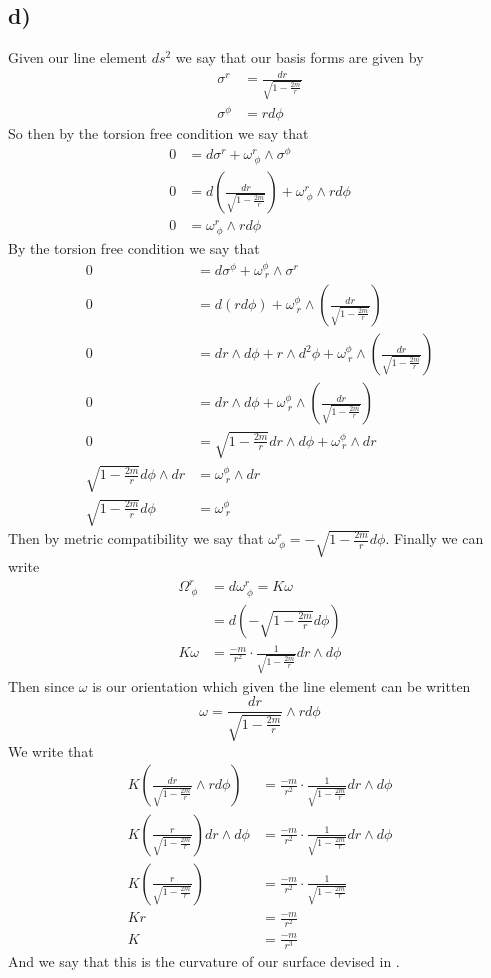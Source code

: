 \documentclass{article}
\theoremstyle{definition}
\begin{document}
\subsection*{d)}
Given our line element $ds^2$ we say that our basis forms are given by 
\begin{align*}
  \sigma^r &= \frac{dr}{\sqrt{1- \frac{2m}{r}}}\\
  \sigma^\phi &= rd\phi
\end{align*}
So then by the torsion free condition we say that
\begin{align*}
  0 &= d\sigma^r + \omega^r_{\ \phi} \wedge \sigma^\phi\\
  0 &= d\left(\frac{dr}{\sqrt{1-\frac{2m}{r}}}\right) + \omega^r_{\ \phi} \wedge rd\phi\\
  0 & = \omega^r_{\ \phi} \wedge r d\phi
\end{align*}
By the torsion free condition we say that 
\begin{align*}
  0&= d\sigma^\phi + \omega^\phi_{\ r} \wedge \sigma^r \\
  0 &= d(rd\phi) + \omega^\phi_{\ r} \wedge \left(\frac{dr}{\sqrt{1- \frac{2m}{r}}}\right)\\
  0 &= dr \wedge d\phi  + r \wedge d^2 \phi + \omega^\phi_{\ r} \wedge \left(\frac{dr}{\sqrt{1- \frac{2m}{r}}}\right) \\
  0 &= dr \wedge d\phi + \omega^\phi_{\ r} \wedge \left(\frac{dr}{\sqrt{1- \frac{2m}{r}}}\right)\\
  0 &= \sqrt{1 - \frac{2m}{r}}dr \wedge d\phi + \omega^\phi_{\ r} \wedge dr \\
  \sqrt{1-\frac{2m}{r}}d\phi \wedge dr &= \omega^\phi_{\ r} \wedge dr\\
  \sqrt{1-\frac{2m}{r}}d\phi & = \omega^\phi_{\ r}
\end{align*}
Then by metric compatibility we say that $\omega^r_{\ \phi} = -\sqrt{1 - \frac{2m}{r}}d\phi$.
Finally we can write 
\begin{align*}
  \Omega^r_{\ \phi} &= d \omega^r_{\ \phi} = K\omega \\
  &= d\left(-\sqrt{1-\frac{2m}{r}}d\phi\right) \\
  K \omega &= \frac{-m}{r^2}\cdot \frac{1}{\sqrt{1- \frac{2m}{r}}}dr \wedge d\phi
\end{align*}
Then since $\omega$ is our orientation which given the line element can be written \[
  \omega = \frac{dr}{\sqrt{1-\frac{2m}{r}}} \wedge rd\phi
\]
We write that 
\begin{align*}
  K\left(\frac{dr}{\sqrt{1-\frac{2m}{r}}} \wedge rd\phi\right) & = \frac{-m}{r^2}\cdot \frac{1}{\sqrt{1- \frac{2m}{r}}}dr \wedge d\phi \\
  K\left(\frac{r}{\sqrt{1-\frac{2m}{r}}}\right)dr \wedge d\phi &= \frac{-m}{r^2}\cdot \frac{1}{\sqrt{1- \frac{2m}{r}}}dr \wedge d\phi \\
  K\left(\frac{r}{\sqrt{1-\frac{2m}{r}}}\right) &= \frac{-m}{r^2}\cdot \frac{1}{\sqrt{1- \frac{2m}{r}}} \\
  Kr &= \frac{-m}{r^2}\\
  K &= \frac{-m}{r^3}
\end{align*}
And we say that this is the curvature of our surface devised in .
\end{document}
